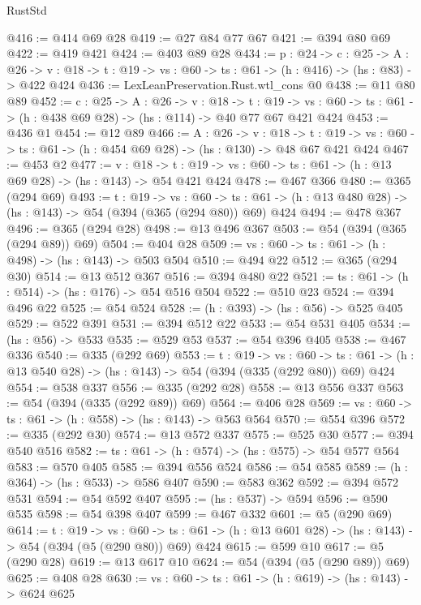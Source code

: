 \begin{lexlean}{RustStd}
\begin{coremodule}
{\begin{coremodule}
{{{{{{{{@416 := @414 @69 @28
@419 := @27 @84 @77 @67
@421 := @394 @80 @69
@422 := @419 @421
@424 := @403 @89 @28
@434 := {p : @24} ->
  {c : @25} ->
  {A : @26} ->
  {v : @18} -> {t : @19} -> {vs : @60} -> {ts : @61} -> (h : @416) -> (hs : @83) -> @422 @424
@436 := LexLeanPreservation.Rust.wtl_cons @0
@438 := @11 @80 @89
@452 := {c : @25} ->
  {A : @26} ->
  {v : @18} ->
  {t : @19} ->
  {vs : @60} -> {ts : @61} -> (h : @438 @69 @28) -> (hs : @114) -> @40 @77 @67 @421 @424
@453 := @436 @1
@454 := @12 @89
@466 := {A : @26} ->
  {v : @18} ->
  {t : @19} -> {vs : @60} -> {ts : @61} -> (h : @454 @69 @28) -> (hs : @130) -> @48 @67 @421 @424
@467 := @453 @2
@477 := {v : @18} ->
  {t : @19} -> {vs : @60} -> {ts : @61} -> (h : @13 @69 @28) -> (hs : @143) -> @54 @421 @424
@478 := @467 @366
@480 := @365 (@294 @69)
@493 := {t : @19} ->
  {vs : @60} ->
  {ts : @61} -> (h : @13 @480 @28) -> (hs : @143) -> @54 (@394 (@365 (@294 @80)) @69) @424
@494 := @478 @367
@496 := @365 (@294 @28)
@498 := @13 @496 @367
@503 := @54 (@394 (@365 (@294 @89)) @69)
@504 := @404 @28
@509 := {vs : @60} -> {ts : @61} -> (h : @498) -> (hs : @143) -> @503 @504
@510 := @494 @22
@512 := @365 (@294 @30)
@514 := @13 @512 @367
@516 := @394 @480 @22
@521 := {ts : @61} -> (h : @514) -> (hs : @176) -> @54 @516 @504
@522 := @510 @23
@524 := @394 @496 @22
@525 := @54 @524
@528 := (h : @393) -> (hs : @56) -> @525 @405
@529 := @522 @391
@531 := @394 @512 @22
@533 := @54 @531 @405
@534 := (hs : @56) -> @533
@535 := @529 @53
@537 := @54 @396 @405
@538 := @467 @336
@540 := @335 (@292 @69)
@553 := {t : @19} ->
  {vs : @60} ->
  {ts : @61} -> (h : @13 @540 @28) -> (hs : @143) -> @54 (@394 (@335 (@292 @80)) @69) @424
@554 := @538 @337
@556 := @335 (@292 @28)
@558 := @13 @556 @337
@563 := @54 (@394 (@335 (@292 @89)) @69)
@564 := @406 @28
@569 := {vs : @60} -> {ts : @61} -> (h : @558) -> (hs : @143) -> @563 @564
@570 := @554 @396
@572 := @335 (@292 @30)
@574 := @13 @572 @337
@575 := @525 @30
@577 := @394 @540 @516
@582 := {ts : @61} -> (h : @574) -> (hs : @575) -> @54 @577 @564
@583 := @570 @405
@585 := @394 @556 @524
@586 := @54 @585
@589 := (h : @364) -> (hs : @533) -> @586 @407
@590 := @583 @362
@592 := @394 @572 @531
@594 := @54 @592 @407
@595 := (hs : @537) -> @594
@596 := @590 @535
@598 := @54 @398 @407
@599 := @467 @332
@601 := @5 (@290 @69)
@614 := {t : @19} ->
  {vs : @60} ->
  {ts : @61} -> (h : @13 @601 @28) -> (hs : @143) -> @54 (@394 (@5 (@290 @80)) @69) @424
@615 := @599 @10
@617 := @5 (@290 @28)
@619 := @13 @617 @10
@624 := @54 (@394 (@5 (@290 @89)) @69)
@625 := @408 @28
@630 := {vs : @60} -> {ts : @61} -> (h : @619) -> (hs : @143) -> @624 @625
}}}}}}}}
\end{coremodule}}
\end{coremodule}
\end{lexlean}
